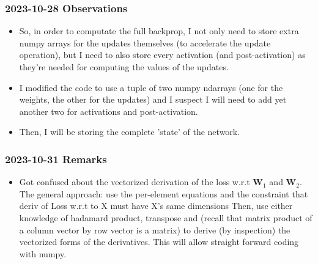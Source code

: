 \documentclass{article}
\begin{document}
\subsubsection{2023-10-28 Observations}
\begin{itemize}
    \item So, in order to computate the full backprop, I not only need to store extra numpy arrays 
    for the updates themselves (to accelerate the update operation), but I need to also store every activation (and post-activation) as they're
    needed for computing the values of the updates.
    \item I modified the code to use a tuple of two numpy ndarrays (one for the weights, the other for the updates)
    and I suspect I will need to add yet another two for activations and post-activation.
    \item Then, I will be storing the complete 'state' of the network.
\end{itemize}
\subsubsection{2023-10-31 Remarks}
\begin{itemize}
    \item Got confused about the vectorized derivation of the loss w.r.t $\bm{W}_1$ and $\bm{W}_2$.
    The general approach: use the per-element equations and the constraint that deriv of Loss w.r.t to X must have X's same dimensions
    Then, use either knowledge of hadamard product, transpose and (recall that matrix product of a column vector by row vector is a matrix)
    to derive (by inspection) the vectorized forms of the derivatives. This will allow straight forward coding with numpy. 
\end{itemize}
\end{document}
